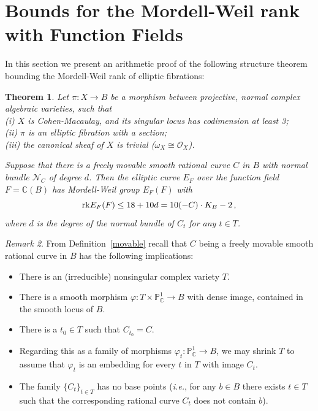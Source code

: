 \documentclass[11pt]{amsart}
\newtheorem{theorem}{Theorem}[section]
\theoremstyle{definition}
\theoremstyle{definition}
\theoremstyle{remark}
\newtheorem{remark}[theorem]{Remark}
\theoremstyle{remark}
\theoremstyle{definition}
\theoremstyle{conjecture}
\begin{document}
\section{ 
Bounds for the Mordell-Weil rank with Function Fields } \label{sec:arithmproof}

{In this section we present an arithmetic proof of the following structure theorem bounding the Mordell-Weil rank of elliptic fibrations:}
\begin{theorem}\label{main2}
Let $\pi:X\to B$ be a morphism between projective, normal complex algebraic varieties, such that \\
(i) $X$ is Cohen-Macaulay, and its singular locus has codimension at least 3;\\
(ii) $\pi$ is an elliptic fibration with a section; \\
(iii) the canonical sheaf of $X$ is trivial ($\omega_X\cong {\mathcal O}_X$).

Suppose that there is a freely movable smooth rational curve $C$ in $B$ with normal bundle $\mathcal{N}_{C}$ of degree $d$.
 Then the elliptic curve $E_F$ over the function field $F={\mathbb C}(B)$
has Mordell-Weil group $E_F(F)$ with
\begin{equation}
       {\rm rk}E_F(F) \leq 18+10d = 10 (-C) \cdot K_B -2 \,,
\end{equation}
where $d$ is the degree of the normal bundle of $C_t$ for any $t\in T$.
\end{theorem}


\begin{remark}
From Definition~\ref{movable} recall that $C$ being a freely movable smooth rational curve in $B$ has the following implications:
\begin{itemize}
    \item There is an (irreducible) nonsingular complex variety $T$.
    \item There is a smooth morphism
$\varphi:T\times{\mathbb P}^1_{\mathbb C}\to B$ with dense image,
contained in the smooth locus of $B$.
    \item There is a $t_0\in T$ such that $C_{t_0}=C$.
    \item Regarding this as a family of morphisms $\varphi_t:{\mathbb
        P}^1_{\mathbb C}\to B$, we may shrink $T$ to assume that $\varphi_t$ is an embedding
        for every $t$ in $T$ with image $C_t$.
    \item The family $\{C_t\}_{t\in T}$ has no base points
({\it i.e.}, for any $b\in B$ there exists $t\in T$
such that the corresponding rational curve $C_t$ does not contain $b$).
\end{itemize}
\end{remark}
\color{black}
\end{document}

